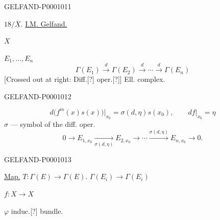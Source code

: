 \begin{GelfandAdjacentEvidence}{GELFAND-P000101}{1}

$18/\overline{\underline X}$. \underline{I.M. Gelfand.}
\par\hspace*{4mm}$X$

$E_1,\ldots,E_n$
\begin{equation*}
\Gamma(E_1)\overset d\longrightarrow\Gamma(E_2)
\overset d\longrightarrow\cdots\overset d\longrightarrow\Gamma(E_n)
\end{equation*}
[Crossed out at right: Diff.[?] oper.[?]] Ell. complex.
\end{GelfandAdjacentEvidence}
\begin{GelfandAdjacentEvidence}{GELFAND-P000101}{2}

\begin{equation*}
d\bigl(f^m(x)s(x)\bigr)\big|_{x_0}=\sigma(d,\eta)s(x_0),
\qquad df\big|_{x_0}=\eta
\end{equation*}
$\sigma$ — symbol of the diff. oper.
\begin{equation*}
0\longrightarrow E_{1,x_0}\underset{\sigma(d,\eta)}\longrightarrow E_{2,x_0}
\longrightarrow\cdots\overset{\sigma(d,\eta)}\longrightarrow E_{n,x_0}\longrightarrow0.
\end{equation*}
\end{GelfandAdjacentEvidence}
\begin{GelfandAdjacentEvidence}{GELFAND-P000101}{3}

\underline{Map.} $T:\Gamma(E)\longrightarrow\Gamma(E)$.
\hfill$\Gamma(E_i)\longrightarrow\Gamma(E_i)$

$f:X\longrightarrow X$

$\varphi$ induc.[?] bundle.
\end{GelfandAdjacentEvidence}
